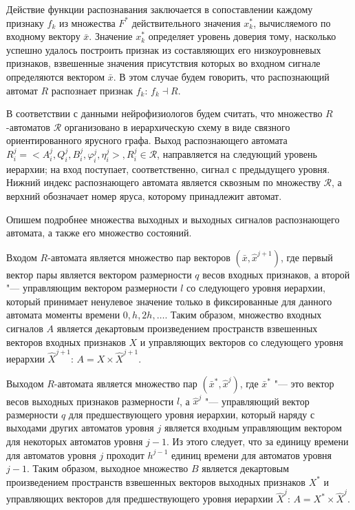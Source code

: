 \documentclass[a4paper, 12pt]{article}
\theoremstyle{plain}
\begin{document}
	Действие функции распознавания заключается в сопоставлении каждому признаку $f_k$ из множества $F^*$ действительного значения $x_k^*$, вычисляемого по входному вектору $\bar x$. Значение $x_k^*$ определяет уровень доверия тому, насколько успешно удалось построить признак из составляющих его низкоуровневых признаков, взвешенные значения присутствия которых во входном сигнале определяются вектором $\bar x$. В этом случае будем говорить, что распознающий автомат $R$ распознает признак $f_k$: $f_k\dashv R$.
	
	В соответствии с данными нейрофизиологов будем считать, что множество $R$-автоматов $\mathcal R$ организовано в иерархическую схему в виде связного ориентированного ярусного графа. Выход распознающего автомата $R_i^j=<A_i^j,Q_i^j,B_i^j,\varphi_i^j, \eta_i^j>, R_i^j\in\mathcal R$, направляется на следующий уровень иерархии; на вход поступает, соответственно, сигнал с предыдущего уровня. Нижний индекс распознающего автомата является сквозным по множеству $\mathcal R$, а верхний обозначает номер яруса, которому принадлежит автомат.
		
	Опишем подробнее множества выходных и выходных сигналов распознающего автомата, а также его множество состояний.
	
	Входом $R$-автомата является множество пар векторов $(\bar x,\hat x^{j+1})$, где первый вектор пары является вектором размерности $q$ весов входных признаков, а второй "--- управляющим вектором размерности $l$ со следующего уровня иерархии, который принимает ненулевое значение только в фиксированные для данного автомата моменты времени $0,h,2h,\dots$. Таким образом, множество входных сигналов $A$ является декартовым произведением пространств взвешенных векторов входных признаков $X$ и управляющих векторов со следующего уровня иерархии $\hat X^{j+1}$: $A=X\times \hat X^{j+1}$. 
	
	Выходом $R$-автомата является множество пар $(\bar x^*,\hat x^j)$, где $\bar x^*$ "--- это вектор весов выходных признаков размерности $l$, а $\hat x^j$ "--- управляющий вектор размерности $q$ для предшествующего уровня иерархии, который наряду с выходами других автоматов уровня $j$ является входным управляющим вектором для некоторых автоматов уровня $j-1$. Из этого следует, что за единицу времени для автоматов уровня $j$ проходит $h^{j-1}$ единиц времени для автоматов уровня $j-1$. Таким образом, выходное множество $B$ является декартовым произведением пространств взвешенных векторов выходных признаков $X^*$ и управляющих векторов для предшествующего уровня иерархии $\hat X^j$: $A=X^*\times \hat X^j$.
	
\end{document}
